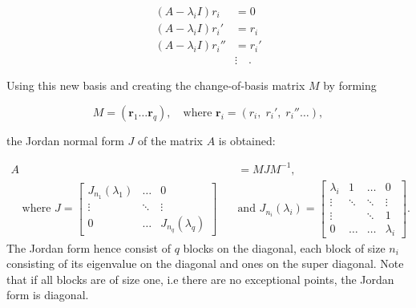 \documentclass[../main.tex]{subfiles}
\begin{document}
\begin{equation}\label{jordanchain}
\begin{aligned}
    (A-\lambda_iI)r_i &= 0 \\
    (A-\lambda_iI)r_i' &= r_i \\
    (A-\lambda_iI)r_i'' &= r_i' \\
    &\vdots \quad.
\end{aligned}
\end{equation}

Using this new basis and creating the change-of-basis matrix $M$ by forming

\begin{equation}\label{chofba}
    M = (\boldsymbol{r}_1 \dots \boldsymbol{r}_q), \quad \text{where } \boldsymbol{r}_i = (r_i,\; r_i',\; r_i'' \dots), 
\end{equation}

the Jordan normal form $J$ of the matrix $A$ is obtained:

\begin{equation}
\begin{aligned}
    A &= MJM^{-1}, \\ \quad \text{where } J = \begin{bmatrix}J_{n_1}(\lambda_1) & \dots & 0 \\
                                                         \vdots & \ddots & \vdots \\
                                                         0 & \dots &  J_{n_q}(\lambda_q)\end{bmatrix} \quad
      &\text{and } J_{n_i}(\lambda_i) = \begin{bmatrix} \lambda_i & 1 & \dots & 0 \\
                                                                                        \vdots  & \ddots & \ddots & \vdots \\
                                                                                        \vdots & & \ddots& 1 \\
                                                                                        0 & \dots & \dots & \lambda_i\end{bmatrix}.
\end{aligned}
\end{equation}
The Jordan form hence consist of $q$ blocks on the diagonal, each block of size $n_i$ consisting of its eigenvalue on the diagonal and ones on the super diagonal. Note that if all blocks are of size one, i.e there are no exceptional points, the Jordan form is diagonal.
\end{document}
